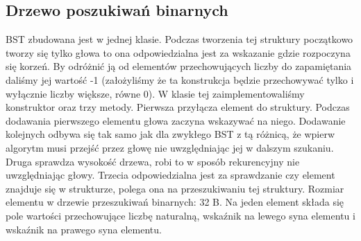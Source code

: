 \documentclass[polish,polish,a4paper]{article}
\begin{document}
\subsection*{Drzewo poszukiwań binarnych}
BST zbudowana jest w jednej klasie. Podczas tworzenia tej struktury początkowo tworzy się tylko głowa to ona odpowiedzialna jest za wskazanie gdzie rozpoczyna się korzeń. By odróżnić ją od elementów przechowujących liczby do zapamiętania daliśmy jej wartość -1 (założyliśmy że ta konstrukcja będzie przechowywać tylko i wyłącznie liczby większe, równe 0). W klasie tej zaimplementowaliśmy konstruktor oraz trzy metody. Pierwsza przyłącza element do struktury. Podczas dodawania pierwszego elementu głowa zaczyna wskazywać na niego. Dodawanie kolejnych odbywa się tak samo jak dla zwykłego  BST z tą różnicą, że wpierw algorytm musi przejść przez głowę nie uwzględniając jej w dalszym szukaniu. Druga sprawdza wysokość drzewa, robi to w sposób rekurencyjny nie uwzględniając głowy. Trzecia odpowiedzialna jest za sprawdzanie czy element znajduje się w strukturze, polega ona na przeszukiwaniu tej struktury.
Rozmiar elementu w drzewie przeszukiwań binarnych:
32 B. Na jeden element składa się pole wartości przechowujące liczbę naturalną, wskaźnik na lewego syna elementu i wskaźnik na prawego syna elementu.
\end{document}
